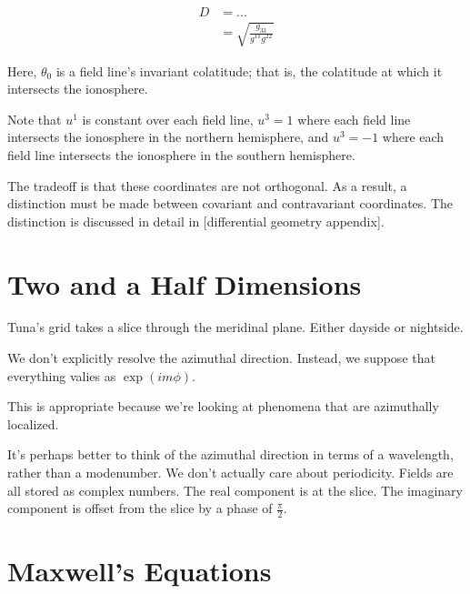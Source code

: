 \begin{align}
  \label{def_jacobian}
  D &= ... \\
    &= \sqrt{ \frac{ g_{33} }{ g^{11} g^{22} } }
\end{align}




Here, $\theta_0$ is a field line's invariant colatitude; that is, the
colatitude at which it intersects the ionosphere. 

Note that $u^1$ is constant over each field line, $u^3 = 1$ where each field
line intersects the ionosphere in the northern hemisphere, and $u^3 = -1$ where
each field line intersects the ionosphere in the southern hemisphere. 

The tradeoff is that these coordinates are not orthogonal. As a result, a
distinction must be made between covariant and contravariant coordinates. The
distinction is discussed in detail in [differential geometry appendix].  

\section{Two and a Half Dimensions}

Tuna's grid takes a slice through the meridinal plane. Either dayside or nightside. 

We don't explicitly resolve the azimuthal direction. Instead, we suppose that everything valies as $\exp(i m \phi)$. 

This is appropriate because we're looking at phenomena that are azimuthally localized. 

It's perhaps better to think of the azimuthal direction in terms of a wavelength, rather than a modenumber. We don't actually care about periodicity. 
Fields are all stored as complex numbers. The real component is at the slice. The imaginary component is offset from the slice by a phase of $\frac{\pi}{2}$. 

\section{Maxwell's Equations}
  \label{model_equations_section}

